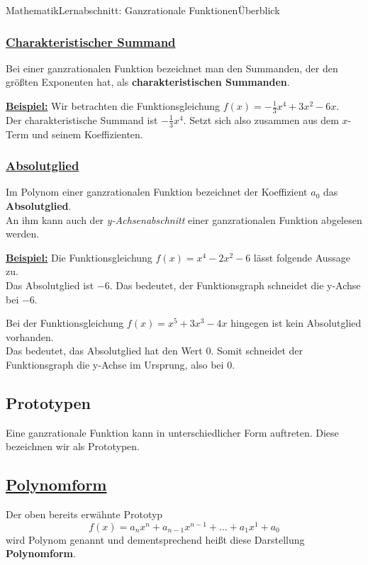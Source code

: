 \documentclass[11pt,twocolumn,oneside,openany,headings=optiontotoc,11pt,numbers=noenddot]{article}
\begin{document}
\begin{worksheet}{Mathematik}{Lernabschnitt: Ganzrationale Funktionen}{Überblick}
		\subsubsection*{\underline{Charakteristischer Summand}}
		Bei einer ganzrationalen Funktion bezeichnet man den Summanden, der den größten Exponenten hat, als \textbf{charakteristischen Summanden}.\\
		\par\noindent
		\underline{\textbf{Beispiel:}} Wir betrachten die Funktionsgleichung \(f(x) = -\frac{1}{3}x^4 + 3x^2 - 6x\).\\
		Der charakteristische Summand ist \colorbox{green!10}{\(-\frac{1}{3}x^4\)}. Setzt sich also zusammen aus dem \(x\)-Term und seinem Koeffizienten.
		\subsubsection*{\underline{Absolutglied}}
		Im Polynom einer ganzrationalen Funktion bezeichnet der Koeffizient \(a_0\) das \textbf{Absolutglied}.\\
		An ihm kann auch der \textit{y-Achsenabschnitt} einer ganzrationalen Funktion abgelesen werden.\\
		\par\noindent
		\underline{\textbf{Beispiel:}} Die Funktionsgleichung \(f(x) = x^4 - 2x^2 - 6\) lässt folgende Aussage zu.\\
		Das Absolutglied ist \colorbox{green!10}{\(-6\)}. Das bedeutet, der Funktionsgraph schneidet die y-Achse bei \(-6\).\\
		\par\noindent
		Bei der Funktionsgleichung \(f(x) = x^5 +3x^3 - 4x\) hingegen ist kein Absolutglied vorhanden.\\
		Das bedeutet, das Absolutglied hat den Wert \colorbox{green!10}{\(0\)}. Somit schneidet der Funktionsgraph die y-Achse im Ursprung, also bei \(0\).
		\subsection{Prototypen}
		Eine ganzrationale Funktion kann in unterschiedlicher Form auftreten. Diese bezeichnen wir als Prototypen.
		\subsection*{\underline{Polynomform}}
		Der oben bereits erwähnte Prototyp \[f(x) = a_nx^n + a_{n-1}x^{n-1} + \ldots + a_1x^1 + a_0\] wird Polynom genannt und dementsprechend heißt diese Darstellung \textbf{Polynomform}.

\end{worksheet}
\end{document}
